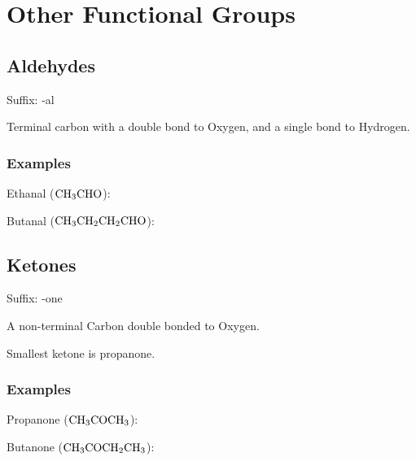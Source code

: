 \documentclass[a4paper,11pt]{article}
\begin{document}
\section{Other Functional Groups}

\subsection{Aldehydes}

Suffix: -al

Terminal carbon with a double bond to Oxygen, and a single bond to Hydrogen.


\subsubsection{Examples}

Ethanal ($\ce{CH3CHO}$):

\begin{center}
\end{center}

Butanal ($\ce{CH3CH2CH2CHO}$):

\begin{center}
\end{center}


\subsection{Ketones}

Suffix: -one

A non-terminal Carbon double bonded to Oxygen.

Smallest ketone is propanone.


\subsubsection{Examples}

Propanone ($\ce{CH3COCH3}$):

\begin{center}
\end{center}

Butanone ($\ce{CH3COCH2CH3}$):

\begin{center}
\end{center}
\end{document}
